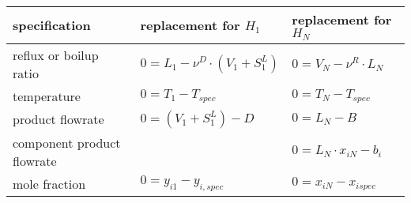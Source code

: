 \begin{tabular}{lll}
	specification & replacement for $H_1$ & replacement for $H_N$ \\ \hline
	reflux or boilup ratio & $0  = L_1 - \nu^D \cdot (V_1 + S_1^L)$ & $0  = V_N - \nu^R \cdot L_N$ \\
	temperature & $0 = T_1 - T_{spec}$ & $0 = T_N - T_{spec}$ \\
	product flowrate & $0 = (V_1 + S_1^L) - D$ & $0 = L_N - B$ \\
	component product flowrate & & $0 = L_N \cdot x_{iN} - b_i$ \\
	mole fraction & $0 = y_{i1} - y_{i,spec}$ & $0 = x_{iN} - x_{ispec}$ \\ \hline
\end{tabular}
